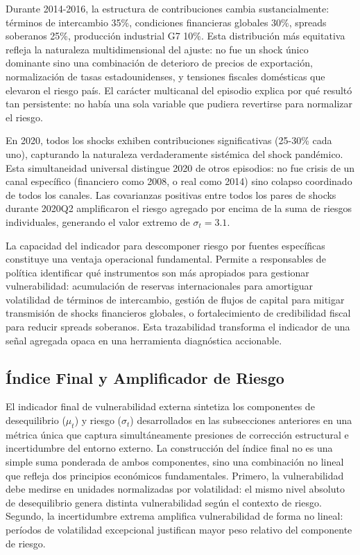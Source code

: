 \documentclass[3p,11pt,draft,natbib=false]{elsarticle}
\begin{document}
Durante 2014-2016, la estructura de contribuciones cambia sustancialmente: términos de intercambio 35\%, condiciones financieras globales 30\%, spreads soberanos 25\%, producción industrial G7 10\%. Esta distribución más equitativa refleja la naturaleza multidimensional del ajuste: no fue un shock único dominante sino una combinación de deterioro de precios de exportación, normalización de tasas estadounidenses, y tensiones fiscales domésticas que elevaron el riesgo país. El carácter multicanal del episodio explica por qué resultó tan persistente: no había una sola variable que pudiera revertirse para normalizar el riesgo.

En 2020, todos los shocks exhiben contribuciones significativas (25-30\% cada uno), capturando la naturaleza verdaderamente sistémica del shock pandémico. Esta simultaneidad universal distingue 2020 de otros episodios: no fue crisis de un canal específico (financiero como 2008, o real como 2014) sino colapso coordinado de todos los canales. Las covarianzas positivas entre todos los pares de shocks durante 2020Q2 amplificaron el riesgo agregado por encima de la suma de riesgos individuales, generando el valor extremo de $\sigma_t = 3.1$.

La capacidad del indicador para descomponer riesgo por fuentes específicas constituye una ventaja operacional fundamental. Permite a responsables de política identificar qué instrumentos son más apropiados para gestionar vulnerabilidad: acumulación de reservas internacionales para amortiguar volatilidad de términos de intercambio, gestión de flujos de capital para mitigar transmisión de shocks financieros globales, o fortalecimiento de credibilidad fiscal para reducir spreads soberanos. Esta trazabilidad transforma el indicador de una señal agregada opaca en una herramienta diagnóstica accionable.

\subsection{Índice Final y Amplificador de Riesgo}
\label{sec:indice_final}

El indicador final de vulnerabilidad externa sintetiza los componentes de desequilibrio ($\mu_t$) y riesgo ($\sigma_t$) desarrollados en las subsecciones anteriores en una métrica única que captura simultáneamente presiones de corrección estructural e incertidumbre del entorno externo. La construcción del índice final no es una simple suma ponderada de ambos componentes, sino una combinación no lineal que refleja dos principios económicos fundamentales. Primero, la vulnerabilidad debe medirse en unidades normalizadas por volatilidad: el mismo nivel absoluto de desequilibrio genera distinta vulnerabilidad según el contexto de riesgo. Segundo, la incertidumbre extrema amplifica vulnerabilidad de forma no lineal: períodos de volatilidad excepcional justifican mayor peso relativo del componente de riesgo.
\end{document}
